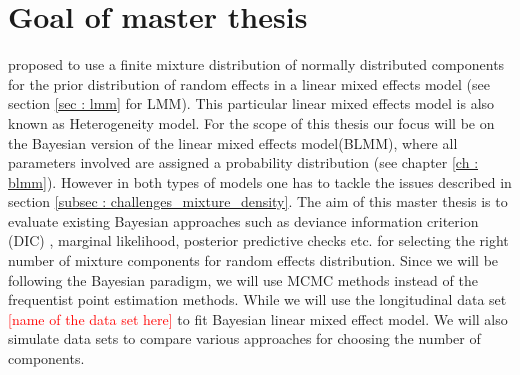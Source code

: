 \section{Goal of master thesis}
\label{sec : goal}
\citet*{verbeke_linear_1996} proposed to use a finite mixture distribution of normally distributed components for the prior distribution of random effects in a linear mixed effects model (see section \ref{sec : lmm} for LMM). This particular linear mixed effects model is also known as Heterogeneity model. For the scope of this thesis our focus will be on the Bayesian version of the linear mixed effects model(BLMM), where all parameters involved are assigned a probability distribution (see chapter \ref{ch : blmm}). However in both types of models one has to tackle the issues described in section \ref{subsec : challenges_mixture_density}. The aim of this master thesis is to evaluate existing Bayesian approaches such as deviance information criterion (DIC) , marginal likelihood, posterior predictive checks etc. for selecting the right number of mixture components for random effects distribution. Since we will be following the Bayesian paradigm, we will use MCMC methods instead of the frequentist point estimation methods. While we will use the longitudinal data set \textcolor{red}{[name of the data set here]} to fit Bayesian linear mixed effect model. We will also simulate data sets to compare various approaches for choosing the number of components.